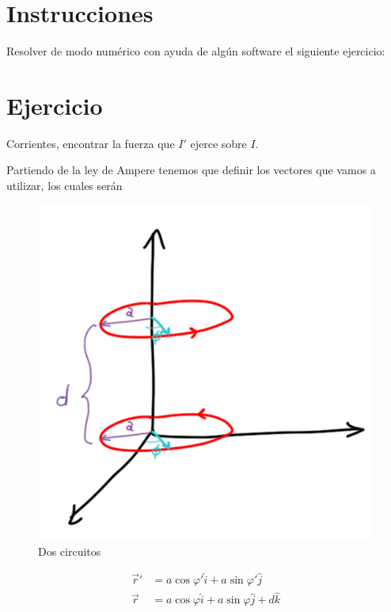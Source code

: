 \documentclass[11pt]{report}
\theoremstyle{plain}
\theoremstyle{definition}
\begin{document}


\section*{Instrucciones}
Resolver de modo numérico con ayuda de algún software el siguiente ejercicio:

\section*{Ejercicio}

	Corrientes, encontrar la fuerza que $I'$ ejerce sobre $I$.
	
	Partiendo de la ley de Ampere tenemos que definir los vectores que vamos a utilizar, los cuales serán
	
	
	\begin{figure}[!h]%
		\centering
		\includegraphics[scale=0.15]{Tarea2_figura.png}
		\caption{Dos circuitos}
		\label{fig:Tarea2}
	\end{figure}
	
	\begin{align*}%
		\vec{r}' &= a\cos\varphi'\hat{i} + a\sin\varphi'\hat{j}\\
		\vec{r} &= a\cos\varphi\hat{i} + a\sin\varphi\hat{j}+d\hat{k}\\
	\end{align*}
	
\end{document}
